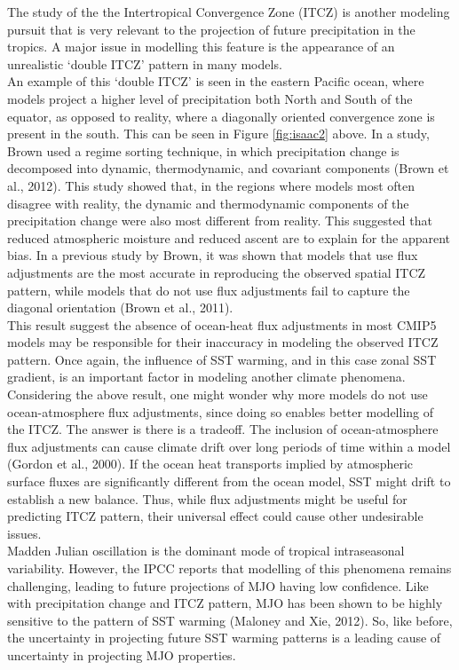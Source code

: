 The study of the the Intertropical Convergence Zone (ITCZ) is another modeling pursuit that is very relevant to the projection of future precipitation in the tropics.  A major issue in modelling this feature is the appearance of an unrealistic ‘double ITCZ’ pattern in many models.  \\
An example of this ‘double ITCZ’ is seen in the eastern Pacific ocean, where models project a higher level of precipitation both North and South of the equator, as opposed to reality, where a diagonally oriented convergence zone is present in the south.  This can be seen in Figure \ref{fig:isaac2} above. In a study, Brown used a regime sorting technique, in which precipitation change is decomposed into dynamic, thermodynamic, and covariant components (Brown et al., 2012).  This study showed that, in the regions where models most often disagree with reality, the dynamic and thermodynamic components of the precipitation change were also most different from reality.  This suggested that reduced atmospheric moisture and reduced ascent are to explain for the apparent bias.  In a previous study by Brown, it was shown that models that use flux adjustments are the most accurate in reproducing the observed spatial ITCZ pattern, while models that do not use flux adjustments fail to capture the diagonal orientation (Brown et al., 2011).\\

This result suggest the absence of ocean-heat flux adjustments in most CMIP5 models may be responsible for their inaccuracy in modeling the observed ITCZ pattern.  Once again, the influence of SST warming, and in this case zonal SST gradient, is an important factor in modeling another climate phenomena.\\

Considering the above result, one might wonder why more models do not use ocean-atmosphere flux adjustments, since doing so enables better modelling of the ITCZ.  The answer is there is a tradeoff.  The inclusion of ocean-atmosphere flux adjustments can cause climate drift over long periods of time within a model (Gordon et al., 2000).  If the ocean heat transports implied by atmospheric surface fluxes are significantly different from the ocean model, SST might drift to establish a new balance.  Thus, while flux adjustments might be useful for predicting ITCZ pattern, their universal effect could cause other undesirable issues.\\

Madden Julian oscillation is the dominant mode of tropical intraseasonal variability.  However, the IPCC reports that modelling of this phenomena remains challenging, leading to future projections of MJO having low confidence.  Like with precipitation change and ITCZ pattern, MJO has been shown to be highly sensitive to the pattern of SST warming (Maloney and Xie, 2012).  So, like before, the uncertainty in projecting future SST warming patterns is a leading cause of uncertainty in projecting MJO properties.\\

